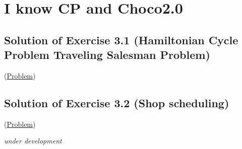 \section{I know CP and Choco2.0}\label{solutions:iknowcpandchoco2.0}\hypertarget{solutions:iknowcpandchoco2.0}{}

\subsection{Solution of Exercise 3.1 (Hamiltonian Cycle Problem Traveling Salesman Problem)}\label{solutions:solutionofexercise3.1}\hypertarget{solutions:solutionofexercise3.1}{}

(\hyperlink{exercises:exercise3.1}{Problem})

\subsection{Solution of Exercise 3.2 (Shop scheduling)}\label{solutions:solutionofexercise3.2}\hypertarget{solutions:solutionofexercise3.2}{}

(\hyperlink{exercises:exercise3.2}{Problem})

\emph{under development}
